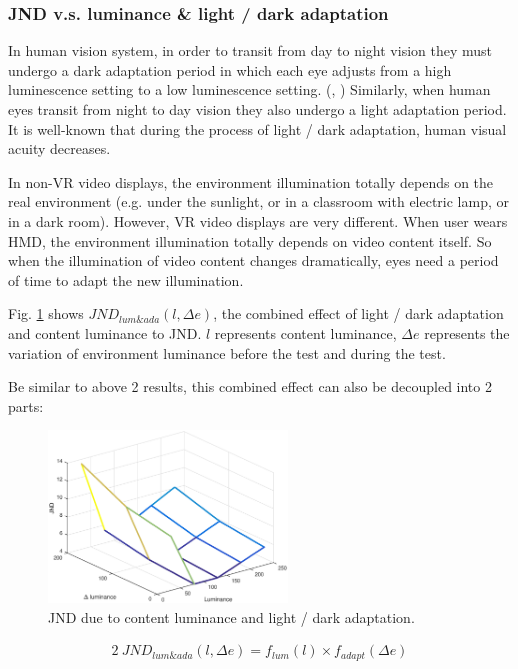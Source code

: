 \subsubsection{JND v.s. luminance \& light / dark adaptation}

In human vision system, in order to transit from day to night vision they must undergo a dark adaptation period in which each eye adjusts from a high luminescence setting to a low luminescence setting. (\cite{darkadaptation}, \cite{darkadaptation2}) Similarly, when human eyes transit from night to day vision they also undergo a light adaptation period. It is well-known that during the process of light / dark adaptation, human visual acuity decreases.

In non-VR video displays, the environment illumination totally depends on the real environment (e.g. under the sunlight, or in a classroom with electric lamp, or in a dark room). However, VR video displays are very different. When user wears HMD, the environment illumination totally depends on video content itself. So when the illumination of video content changes dramatically, eyes need a period of time to adapt the new illumination.

Fig. \ref{JNDadapt-lum} shows $JND_{lum\&ada}(l, \Delta e)$, the combined effect of light / dark adaptation and content luminance to JND. $l$ represents content luminance, $\Delta e$ represents the variation of environment luminance before the test and during the test. 

Be similar to above 2 results, this combined effect can also be decoupled into 2 parts:

\begin{figure}
  \centering
  \includegraphics[width=2.5in]{images/JNDadapt-lum.eps}
  \caption{JND due to content luminance and light / dark adaptation.}
  \label{JNDadapt-lum}
  \end{figure}

\begin{alignat}{2}\
JND_{lum\&ada}(l, \Delta e) = f_{lum}(l) \times f_{adapt}(\Delta e)
\end{alignat}

